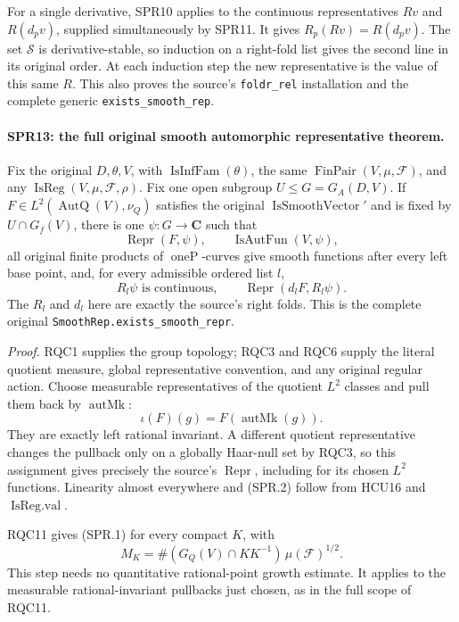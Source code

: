 \documentclass[11pt,a4paper]{article}
\numberwithin{equation}{section}
\theoremstyle{remark}\newtheorem{remark}[theorem]{Remark}
\begin{document}
For a single derivative, SPR10 applies to the continuous
representatives \(Rv\) and \(R(d_pv)\), supplied simultaneously
by SPR11.  It gives \(R_p(Rv)=R(d_pv)\).
The set \(\mathcal S\) is derivative-stable, so induction on a
right-fold list gives the second line in its original order.
At each induction step the new representative is the value of
this same \(R\).  This also proves the source's
\texttt{foldr\_\allowbreak rel} installation and the complete generic
\texttt{exists\_\allowbreak smooth\_\allowbreak rep}.

\paragraph{SPR13: the full original smooth automorphic representative theorem.}
\label{claim:SPR13}
Fix the original \(D,\theta,V\), with \(\operatorname{IsInfFam}(\theta)\),
the same \(\operatorname{FinPair}(V,\mu,\mathcal F)\), and any
\(\operatorname{IsReg}(V,\mu,\mathcal F,\rho)\).
Fix one open subgroup \(U\le G=G_A(D,V)\).
If \(F\in L^2(\operatorname{AutQ}(V),\nu_Q)\) satisfies the original
\(\operatorname{IsSmoothVector}'\) and is fixed by
\(U\cap G_f(V)\), there is one \(\psi:G\to\mathbf C\) such that
\[
 \operatorname{Repr}(F,\psi),\qquad
                  \operatorname{IsAutFun}(V,\psi),
 \tag{SPR.24}
\]
all original finite products of \(\operatorname{oneP}\)-curves give
smooth functions after every left base point, and, for every
admissible ordered list \(l\),
\[
       R_l\psi\text{ is continuous},\qquad
                    \operatorname{Repr}(d_lF,R_l\psi).
 \tag{SPR.25}
\]
The \(R_l\) and \(d_l\) here are exactly the source's right folds.
This is the complete original
\texttt{SmoothRep.\allowbreak exists\_\allowbreak smooth\_\allowbreak repr}.

\emph{Proof.}
RQC1 supplies the group topology; RQC3 and RQC6 supply the literal
quotient measure, global representative convention, and any original
regular action.  Choose measurable representatives of the quotient
\(L^2\) classes and pull them back by \(\operatorname{autMk}\):
\[
                   \iota(F)(g)=F(\operatorname{autMk}(g)).
\]
They are exactly left rational invariant.  A different quotient
representative changes the pullback only on a globally Haar-null
set by RQC3, so this assignment gives precisely the source's
\(\operatorname{Repr}\), including for its chosen \(L^2\) functions.
Linearity almost everywhere and (SPR.2) follow from HCU16 and
\(\operatorname{IsReg.val}\).

RQC11 gives (SPR.1) for every compact \(K\), with
\[
       M_K=\#(G_Q(V)\cap KK^{-1})\,\mu(\mathcal F)^{1/2}.
 \tag{SPR.26}
\]
This step needs no quantitative rational-point growth estimate.
It applies to the measurable rational-invariant pullbacks just
chosen, as in the full scope of RQC11.
\end{document}
